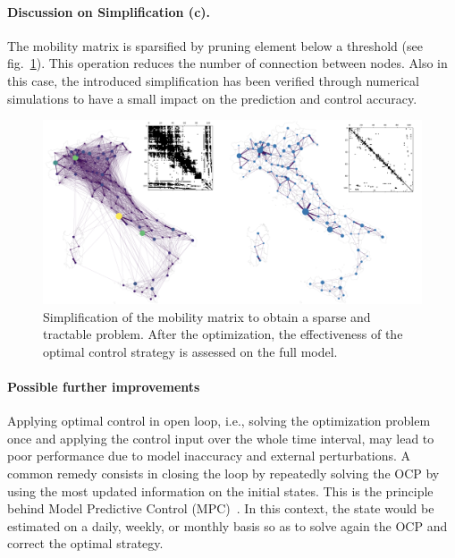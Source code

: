 \paragraph{Discussion on Simplification (c).} The mobility matrix is sparsified by pruning element below a threshold (see fig.~\ref{figSI:mobility_simplification}). This operation reduces the number of connection between nodes. Also in this case, the introduced simplification has been verified through numerical simulations to have a small impact on the prediction and control accuracy.

\begin{figure}
\centering
\includegraphics[width=\textwidth]{fig_italy-ocp/figuresSI/mobsimplification.png}
\caption[Simplification of the mobility matrix to obtain a sparse and tractable problem]{Simplification of the mobility matrix to obtain a sparse and tractable problem. After the optimization, the effectiveness of the optimal control strategy is assessed on the full model.} \label{figSI:mobility_simplification}
\end{figure}

\paragraph{Possible further improvements} Applying optimal control in open loop, i.e., solving the optimization problem once and applying the control input over the whole time interval, may lead to poor performance due to model inaccuracy and external perturbations. A common remedy consists in closing the loop by repeatedly solving the OCP by using the most updated information on the initial states. This is the principle behind Model Predictive Control (MPC)~\cite{Rawlings:ModelPredictiveControl:2017}. In this context, the state would be estimated on a daily, weekly, or monthly basis so as to solve again the OCP and correct the optimal strategy.


